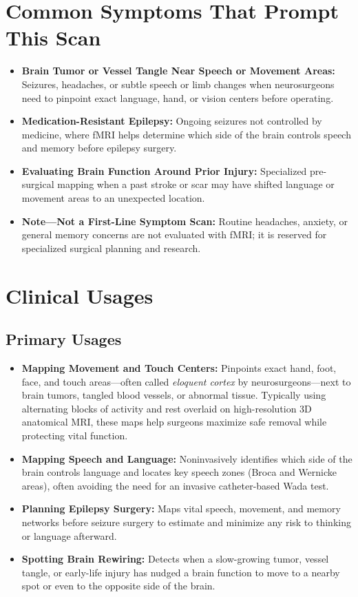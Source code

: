 \section{Common Symptoms That Prompt This Scan}
\begin{itemize}
    \item \textbf{Brain Tumor or Vessel Tangle Near Speech or Movement Areas:} Seizures, headaches, or subtle speech or limb changes when neurosurgeons need to pinpoint exact language, hand, or vision centers before operating.
    \item \textbf{Medication-Resistant Epilepsy:} Ongoing seizures not controlled by medicine, where fMRI helps determine which side of the brain controls speech and memory before epilepsy surgery.
    \item \textbf{Evaluating Brain Function Around Prior Injury:} Specialized pre-surgical mapping when a past stroke or scar may have shifted language or movement areas to an unexpected location.
    \item \textbf{Note---Not a First-Line Symptom Scan:} Routine headaches, anxiety, or general memory concerns are not evaluated with fMRI; it is reserved for specialized surgical planning and research.
\end{itemize}

\section{Clinical Usages}

\subsection{Primary Usages}

\begin{itemize}
    \item \textbf{Mapping Movement and Touch Centers:} Pinpoints exact hand, foot, face, and touch areas---often called \textit{eloquent cortex} by neurosurgeons---next to brain tumors, tangled blood vessels, or abnormal tissue. Typically using alternating blocks of activity and rest overlaid on high-resolution 3D anatomical MRI, these maps help surgeons maximize safe removal while protecting vital function.
    \item \textbf{Mapping Speech and Language:} Noninvasively identifies which side of the brain controls language and locates key speech zones (Broca and Wernicke areas), often avoiding the need for an invasive catheter-based Wada test.
    \item \textbf{Planning Epilepsy Surgery:} Maps vital speech, movement, and memory networks before seizure surgery to estimate and minimize any risk to thinking or language afterward.
    \item \textbf{Spotting Brain Rewiring:} Detects when a slow-growing tumor, vessel tangle, or early-life injury has nudged a brain function to move to a nearby spot or even to the opposite side of the brain.
\end{itemize}

